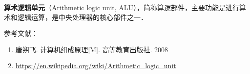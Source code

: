 
\textbf{算术逻辑单元}（Arithmetic logic unit, ALU），简称算逻部件，主要功能是进行算术和逻辑运算，是中央处理器的核心部件之一．



参考文献：
\begin{enumerate}
\item 唐朔飞. 计算机组成原理[M]. 高等教育出版社. 2008
\item \href{https://en.wikipedia.org/wiki/Arithmetic_logic_unit}{https://en.wikipedia.org/wiki/Arithmetic_logic_unit}
\end{enumerate}